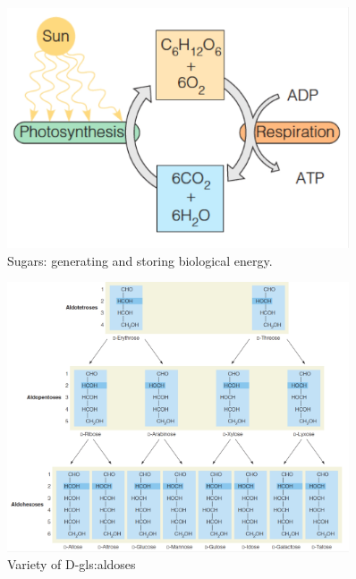 \documentclass[]{article}
\begin{document}
\begin{figure}[H]
	\caption{Sugars: generating and storing biological energy.}\label{fig:SugarsCycle} 
	\includegraphics[width=0.9\textwidth]{SugarsCycle}
\end{figure}

\begin{figure}[H]
	\caption{Variety of D-\glspl{gls:aldose}}\label{fig:SugarsStructure} 
	\includegraphics[width=0.9\textwidth]{SugarsStructure}
\end{figure}
\end{document}
